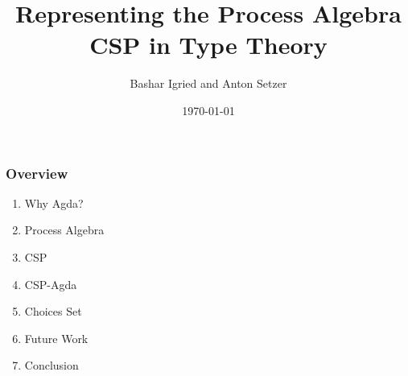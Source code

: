 \documentclass{beamer}
\title[Representing the Process Algebra CSP in Type
Theory]{Representing the Process Algebra CSP in Type
Theory} %
\author{Bashar Igried and Anton Setzer} %
\institute[Swansea University] %
{
Swansea University, Swansea,Wales, UK \\ %
\medskip
\textit{bashar.igried@yahoo.com , a.g.setzer@swansea.ac.uk} %
}
\date{\today} %
\begin{document}



\begin{frame}
\titlepage
\end{frame}








\begin{frame}
\frametitle{Overview}
\begin{enumerate}

\item Why Agda?
\item Process Algebra 
\item CSP
\item CSP-Agda
\item Choices Set 
\item Future Work
\item Conclusion
 


\end{enumerate}
\end{frame}









%
%
%
%
%
%
%
%
\end{document}
